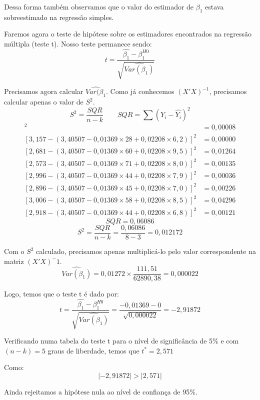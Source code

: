 \documentclass[]{ufpe-exercises}
\begin{document}
\begin{questions}
\begin{parts}
\begin{solution}
			Dessa forma também observamos que o valor do estimador de \(\beta_{1}\) estava sobreestimado na regressão simples.

			Faremos agora o teste de hipótese sobre os estimadores encontrados na regressão múltipla (teste t). Nosso teste permanece sendo:
			\[ t = \frac{\hat{\beta_{1}} - \beta^{H0}_{1}}{\sqrt{\widehat{Var(\beta_{1})}}} \]

			Precisamos agora calcular \(\widehat{Var(\beta_{1}}\). Como já conhecemos \((X'X)^{-1}\), precisamos calcular apenas o valor de \(S^{2}\).
			\[
				S^{2} = \frac{SQR}{n - k} \qquad
				SQR = \sum (Y_{i} - \hat{Y_{i}})^{2}
			\]
			\begin{align*}
				[3,045 - (3,40507 - 0,01369 \times 35 + 0,02208 \times 5,0)]^{2} & = 0,00008 \\
				[3,157 - (3,40507 - 0,01369 \times 28 + 0,02208 \times 6,2)]^{2} & = 0,00000 \\
				[2,681 - (3,40507 - 0,01369 \times 60 + 0,02208 \times 9,5)]^{2} & = 0,01264 \\
				[2,573 - (3,40507 - 0,01369 \times 71 + 0,02208 \times 8,0)]^{2} & = 0,00135 \\
				[2,996 - (3,40507 - 0,01369 \times 44 + 0,02208 \times 7,9)]^{2} & = 0,00036 \\
				[2,896 - (3,40507 - 0,01369 \times 45 + 0,02208 \times 7,0)]^{2} & = 0,00226 \\
				[3,006 - (3,40507 - 0,01369 \times 58 + 0,02208 \times 8,5)]^{2} & = 0,04296 \\
				[2,918 - (3,40507 - 0,01369 \times 44 + 0,02208 \times 6,8)]^{2} & = 0,00121
			\end{align*}
			\[ SQR = 0,06086\]
			\[ S^{2} = \frac{SQR}{n - k} = \frac{0,06086}{8 - 3} = 0,012172\]

			Com o \(S^{2}\) calculado, precisamos apenas multiplicá-lo pelo valor correspondente na matriz \((X'X)^-1\).
			\[ \widehat{Var(\beta_{1})} = 0,01272 \times \frac{111,51}{62890,38} = 0,000022\]

			Logo, temos que o teste t é dado por:
			\[ t = \frac{\hat{\beta_{1}} - \beta_{1}^{H0}}{\sqrt{\widehat{Var(\beta_{1})}}} = \frac{-0,01369 - 0}{\sqrt{0,000022}} = -2,91872\]

			Verificando numa tabela do teste t para o nível de significância de 5\% e com \((n - k) = 5\) graus de liberdade, temos que \(t^{*} = 2,571\)

			Como:
			\[\lvert -2,91872 \rvert > \lvert 2,571 \rvert\]

			Ainda rejeitamos a hipótese nula ao nível de confiança de 95\%.


\end{solution}
\end{parts}
\end{questions}
\end{document}
